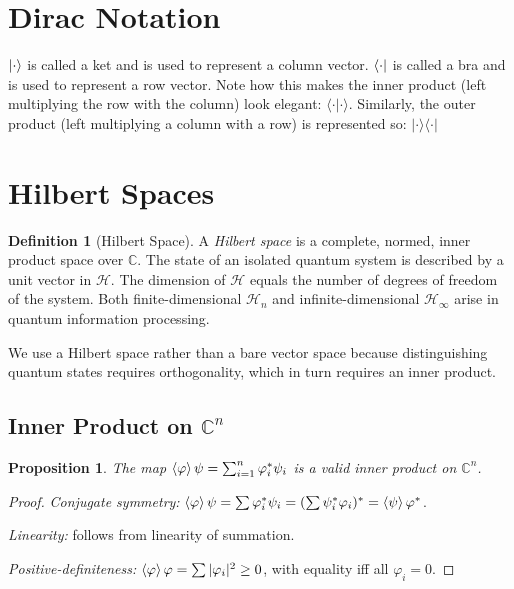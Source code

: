 \documentclass[12pt, a4paper, oneside]{report}
\theoremstyle{plain}
\newtheorem{proposition}[theorem]{Proposition}
\theoremstyle{definition}
\newtheorem{definition}[theorem]{Definition}
\theoremstyle{remark}
\newcommand{\Hcal}{\mathcal{H}}
\newcommand{\CC}{\mathbb{C}}
\begin{document}
\section {Dirac Notation}
$\ket{\cdot}$ is called a ket and is used to represent a column vector. 
$\bra{\cdot}$ is called a bra and is used to represent a row vector. Note how this makes the inner product (left multiplying the row with the column) look elegant: $\langle \cdot \vert \cdot \rangle$. Similarly, the outer product (left multiplying a column with a row) is represented so: $\vert \cdot \rangle \langle \cdot \vert$ 





\section{Hilbert Spaces}

\begin{definition}[Hilbert Space]
A \emph{Hilbert space} is a complete, normed, inner product space over $\CC$. The state of an isolated
quantum system is described by a unit vector in $\Hcal$. The dimension of $\Hcal$ equals the
number of degrees of freedom of the system. Both finite-dimensional $\Hcal_n$ and
infinite-dimensional $\Hcal_\infty$ arise in quantum information processing.
\end{definition}

We use a Hilbert space rather than a bare vector space because distinguishing quantum states
requires orthogonality, which in turn requires an inner product. 


\subsection{Inner Product on \texorpdfstring{$\CC^n$}{Cn}}

\begin{proposition}
The map $\braket{\varphi}{\psi} = \sum_{i=1}^n \varphi_i^* \psi_i$ is a valid inner product
on $\CC^n$.
\end{proposition}

\begin{proof}
\emph{Conjugate symmetry:}
$\braket{\varphi}{\psi} = \sum\varphi_i^*\psi_i = (\sum\psi_i^*\varphi_i)^* = \braket{\psi}{\varphi}^*$.

\emph{Linearity:} follows from linearity of summation.

\emph{Positive-definiteness:}
$\braket{\varphi}{\varphi} = \sum|\varphi_i|^2 \geq 0$, with equality iff all $\varphi_i = 0$.
\end{proof}
\end{document}
